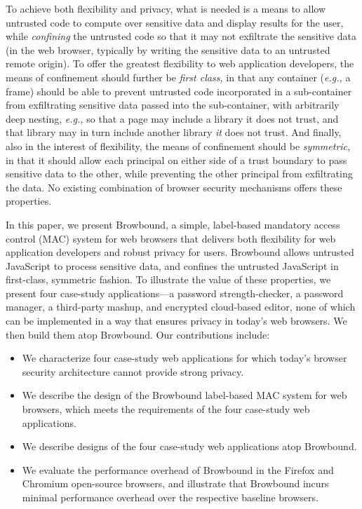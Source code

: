 To achieve both flexibility and privacy, what is needed is a means to
allow untrusted code to compute over sensitive data and display
results for the user, while {\em confining} the untrusted code so that
it may not exfiltrate the sensitive data (in the web browser,
typically by writing the sensitive data to an untrusted remote
origin). To offer the greatest flexibility to web application
developers, the means of confinement should further be {\em first
  class,} in that any container ({\em e.g.,} a frame) should be able
to prevent untrusted code incorporated in a sub-container from
exfiltrating sensitive data passed into the sub-container, with
arbitrarily deep nesting, {\em e.g.,} so that a page may include a
library it does not trust, and that library may in turn include
another library {\em it} does not trust. And finally, also in the
interest of flexibility, the means of confinement should be {\em
  symmetric,} in that it should allow each principal on either side of
a trust boundary to pass sensitive data to the other, while preventing
the other principal from exfiltrating the data. No existing
combination of browser security mechanisms offers these properties.

In this paper, we present Browbound, a simple, label-based mandatory
access control (MAC) system for web browsers that delivers both
flexibility for web application developers and robust privacy for
users. Browbound allows untrusted JavaScript to process sensitive
data, and confines the untrusted JavaScript in first-class, symmetric
fashion. To illustrate the value of these properties, we present four
case-study applications---a password strength-checker, a password
manager, a third-party mashup, and encrypted cloud-based editor, none
of which can be implemented in a way that ensures privacy in today's
web browsers. We then build them atop Browbound. Our contributions
include:

\begin{itemize}
\item We characterize four case-study web applications for which
  today's browser security architecture cannot provide strong privacy.
\item We describe the design of the Browbound label-based MAC system
  for web browsers, which meets the requirements of the four
  case-study web applications.
\item We describe designs of the four case-study web applications atop
  Browbound.
\item We evaluate the performance overhead of Browbound in the Firefox
  and Chromium open-source browsers, and illustrate that Browbound
  incurs minimal performance overhead over the respective baseline
  browsers.
\end{itemize}
